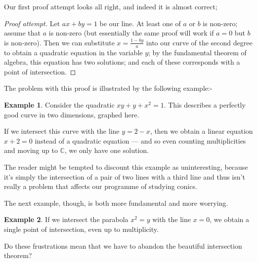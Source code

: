 \documentclass[a4paper,leqno,10pt]{article}
\theoremstyle{exercise}
\theoremstyle{plain}
\theoremstyle{definition}
\newtheorem*{ex}{Example}
\theoremstyle{remark}
\begin{document}
Our first proof attempt looks all right, and indeed it is almost correct;

\begin{proof}[Proof attempt]
  Let $ ax + by = 1 $ be our line. At least one of $ a $ or $ b $ is non-zero; assume that $ a $ is
  non-zero (but essentially the same proof will work if $ a = 0 $ but $ b $ is non-zero). Then we
  can substitute $ x = \frac{1 - by}{a} $ into our curve of the second degree to obtain a quadratic
  equation in the variable $ y $; by the fundamental theorem of algebra, this equation has two solutions;
  and each of these corresponds with a point of intersection.
\end{proof}

The problem with this proof is illustrated by the following example:-
\begin{ex}
  Consider the quadratic $ xy + y + x^2 = 1 $. This describes a perfectly good curve in two dimensions, graphed here.
  \begin{center}
  \end{center}
  If we intersect this curve with the line $ y = 2 - x $, then we obtain a linear equation $ x + 2 = 0 $ instead of a quadratic
  equation --- and so even counting multiplicities and moving up to $ \mathbb{C} $, we only have one solution.
\end{ex}

The reader might be tempted to discount this example as uninteresting, because it's simply the intersection of a pair of two lines
with a third line and thus isn't really a problem that affects our programme of studying conics.

The next example, though, is both more fundamental and more worrying.
\begin{ex}
  If we intersect the parabola $ x^2 = y $ with the line $ x = 0 $, we obtain a single point of intersection, even
  up to multiplicity.
\end{ex}

Do these frustrations mean that we have to abandon the beautiful intersection theorem?
\end{document}
